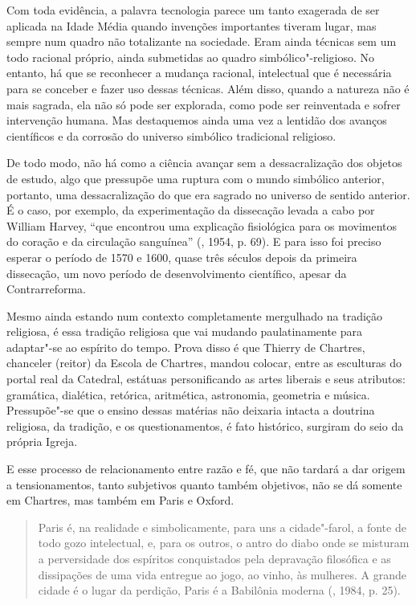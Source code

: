 Com toda evidência, a palavra tecnologia parece um tanto exagerada de
ser aplicada na Idade Média quando invenções importantes tiveram lugar,
mas sempre num quadro não totalizante na sociedade. Eram ainda técnicas
sem um todo racional próprio, ainda submetidas ao quadro
simbólico"-religioso. No entanto, há que se reconhecer a mudança
racional, intelectual que é necessária para se conceber e fazer uso
dessas técnicas. Além disso, quando a natureza não é mais sagrada, ela
não só pode ser explorada, como pode ser reinventada e sofrer
intervenção humana. Mas destaquemos ainda uma vez a lentidão dos avanços
científicos e da corrosão do universo simbólico tradicional religioso.

De todo modo, não há como a ciência avançar sem a dessacralização dos
objetos de estudo, algo que pressupõe uma ruptura com o mundo simbólico
anterior, portanto, uma dessacralização do que era sagrado no universo
de sentido anterior. É o caso, por exemplo, da experimentação da
dissecação levada a cabo por William Harvey, ``que encontrou uma
explicação fisiológica para os movimentos do coração e da circulação
sanguínea'' (, 1954, p. 69). E para isso foi preciso esperar o
período de 1570 e 1600, quase três séculos depois da primeira
dissecação, um novo período de desenvolvimento científico, apesar da
Contrarreforma.

Mesmo ainda estando num contexto completamente mergulhado na tradição
religiosa, é essa tradição religiosa que vai mudando paulatinamente para
adaptar"-se ao espírito do tempo. Prova disso é que Thierry de Chartres,
chanceler (reitor) da Escola de Chartres, mandou colocar, entre as
esculturas do portal real da Catedral, estátuas personificando as artes
liberais e seus atributos: gramática, dialética, retórica, aritmética,
astronomia, geometria e música. Pressupõe"-se que o ensino dessas
matérias não deixaria intacta a doutrina religiosa, da tradição, e os
questionamentos, é fato histórico, surgiram do seio da própria Igreja.

E esse processo de relacionamento entre razão e fé, que não tardará a
dar origem a tensionamentos, tanto subjetivos quanto também objetivos,
não se dá somente em Chartres, mas também em Paris e Oxford.

\begin{quote}
Paris é, na realidade e simbolicamente, para uns a cidade"-farol, a fonte
de todo gozo intelectual, e, para os outros, o antro do diabo onde se
misturam a perversidade dos espíritos conquistados pela depravação
filosófica e as dissipações de uma vida entregue ao jogo, ao vinho, às
mulheres. A grande cidade é o lugar da perdição, Paris é a Babilônia
moderna (, 1984, p. 25).
\end{quote}


